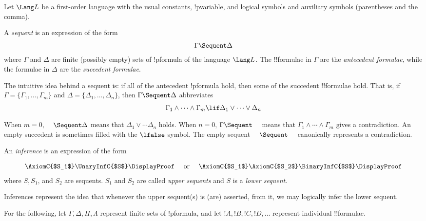\documentclass[../../include/open-logic-section]{subfiles}
\begin{document}


Let $\Lang L$ be a first-order language with the usual constants, !p{variable}, and logical symbols and auxiliary symbols (parentheses and the comma). 

\begin{defn}[sequent]
A \emph{sequent} is an expression of the form
\[ \Gamma \Sequent \Delta \]
where $\Gamma$ and $\Delta$ are finite (possibly empty) sets of !p{formula} of the language $\Lang L$. The !!{formula}e in $\Gamma$ are the \emph{antecedent formulae}, while the formulae in $\Delta$ are the \emph{succedent formulae}. 

The intuitive idea behind a sequent is: if all of the antecedent !p{formula} hold, then some of the succedent !!{formula}e hold. That is, if $\Gamma = \{ \Gamma_1,\ldots,\Gamma_m\}$ and $\Delta = \{ \Delta_1,\ldots, \Delta_n\}$, then $\Gamma \Sequent \Delta$ abbreviates
\[ \Gamma_1 \land \cdots \land \Gamma_m \lif \Delta_1 \lor \cdots \lor \Delta_n \]

When $m=0$, $\hspace{1em} \Sequent \Delta$ means that $\Delta_1 \lor \cdots \Delta_n$ holds. When $n=0$, $\Gamma \Sequent \hspace{1em}$ means that $\Gamma_1 \land \cdots \land \Gamma_m$ gives a contradiction. An empty succedent is sometimes filled with the $\lfalse$ symbol. The empty sequent $\hspace{1em} \Sequent \hspace{1em}$ canonically represents a contradiction.
\end{defn}

\begin{defn}[Inference]
An \emph{inference} is an expression of the form

\[
\AxiomC{$S_1$}
\UnaryInfC{$S$}
\DisplayProof
\quad
\textrm{  or  }
\quad
\AxiomC{$S_1$}
\AxiomC{$S_2$}
\BinaryInfC{$S$}
\DisplayProof
\]
where $S, S_1$, and $S_2$ are sequents. $S_1$ and $S_2$ are called \emph{upper sequents} and $S$ is a \emph{lower sequent}.

Inferences represent the idea that whenever the upper sequent(s) is (are) asserted, from it, we may logically infer the lower sequent.
\end{defn}

For the following, let $\Gamma, \Delta, \Pi, \Lambda$ represent finite sets of !p{formula}, and let $!A, !B, !C, !D, \ldots$ represent individual !!{formula}e.
\end{document}
